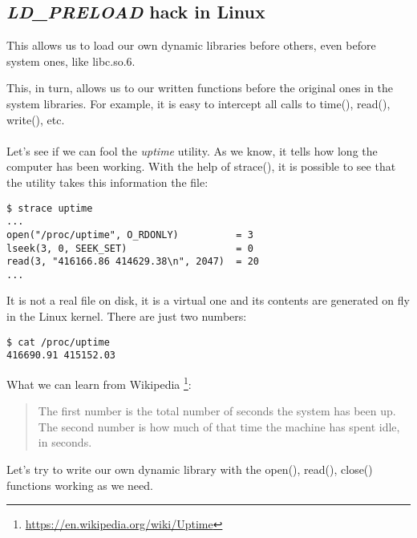 \subsection{\emph{LD\_PRELOAD} hack in Linux}

\label{ld_preload}

This allows us to load our own dynamic libraries before others, even before system ones, like libc.so.6.

This, in turn, allows us to  our written functions before the original ones in the system libraries.
For example, it is easy to intercept all calls to 
time(), read(), write(), etc. \\
\\
Let's see if we can fool the \emph{uptime} utility.
As we know, it tells how long the computer has been working.
With the help of strace(), it is possible to see that the utility takes this information the  file:

\begin{lstlisting}
$ strace uptime 
...
open("/proc/uptime", O_RDONLY)          = 3
lseek(3, 0, SEEK_SET)                   = 0
read(3, "416166.86 414629.38\n", 2047)  = 20
...
\end{lstlisting}

It is not a real file on disk, it is a virtual one and its contents are generated on fly in the Linux kernel.
There are just two numbers:

\begin{lstlisting}
$ cat /proc/uptime
416690.91 415152.03
\end{lstlisting}

What we can learn from Wikipedia
\footnote{\url{https://en.wikipedia.org/wiki/Uptime}}:

\begin{framed}
\begin{quotation}
The first number is the total number of seconds the system has been up.
The second number is how much of that time the machine has spent idle, in seconds.
\end{quotation}
\end{framed}


Let's try to write our own dynamic library with the open(), read(), close() 
functions working as we need.


